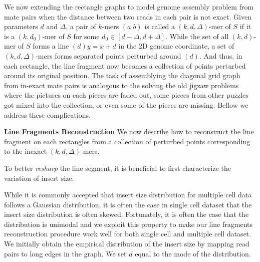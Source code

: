 \documentclass[a4paper]{article}
\begin{document}
We now extending the rectangle graphs to model genome assembly problem from mate pairs when the distance 
between two reads in each pair is not exact. Given parameters $d$ and $\Delta$, 
a pair of $k$-mers $(a|b)$ is called a $(k,d,\Delta)$-mer of $S$
if it is a $(k,d_0)$-mer of $S$ for some $d_0 \in [d-\Delta, d+ \Delta]$. While the set of all $(k,d)$-mer 
of $S$ forms a line $(d) y = x + d$ in the 2D genome coordinate, a set of $(k,d,\Delta)$-mers forms 
separated points perturbed around $(d)$. And thus, in each rectangle, the line fragment now becomes a collection of points 
perturbed around its original position.
The task of assemblying the diagonal grid graph from in-exact mate pairs is analogous to 
the solving the old jigzaw problems where the pictures on each pieces are faded out, some pieces from other puzzles got mixed into 
the collection, or even some of the pieces are missing. Bellow we address these complications.

\noindent 
\textbf{Line Fragments Reconstruction} 
We now describe how to reconstruct the line fragment on each rectangles from a collection of perturbed points corresponding to the 
inexact $(k,d,\Delta)$ mers.  


 To better \emph{resharp}
the line segment, it is beneficial to first characterize the variation of insert size. 

While it is commonly accepted that insert size distribution for multiple cell data follows a Gaussian distribution,
it is often the case in single cell dataset that the insert size distribution is often skewed. Fortunately, it is often the case 
that the distribution is unimodal and we exploit this property to make our line fragments reconstruction procedure work well for
both single cell and multiple cell dataset. We initially obtain the empirical distribution of the insert size 
by mapping read pairs to long edges in the graph. We set $d$ equal to the mode of the distribution.  
\end{document}
